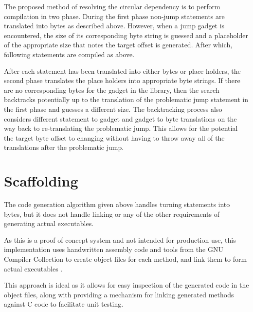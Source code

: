     The proposed method of resolving the circular dependency is to perform
    compilation in two phase. During the first phase non-jump statements are
    translated into bytes as described above. However, when a jump gadget is
    encountered, the size of its corresponding byte string is guessed and a
    placeholder of the appropriate size that notes the target offset is
    generated. After which, following statements are compiled as above.

    After each statement has been translated into either bytes or place holders,
    the second phase translates the place holders into appropriate byte strings.
    If there are no corresponding bytes for the gadget in the library, then the
    search backtracks potentially up to the translation of the problematic jump
    statement in the first phase and guesses a different size. The backtracking
    process also considers different statement to gadget and gadget to byte
    translations on the way back to re-translating the problematic jump. This
    allows for the potential the target byte offset to changing without having
    to throw away all of the translations after the problematic jump.

    \section{Scaffolding}

    The code generation algorithm given above handles turning statements into
    bytes, but it does not handle linking or any of the other requirements of
    generating actual executables.

%    

    As this is a proof of concept system and not intended for production use,
    this implementation uses handwritten assembly code and tools from the GNU
    Compiler Collection to create object files for each method, and link them to
    form actual executables \cite{gcc}.

    This approach is ideal as it allows for easy inspection of the generated
    code in the object files, along with providing a mechanism for linking
    generated methods against C code to facilitate unit testing.

